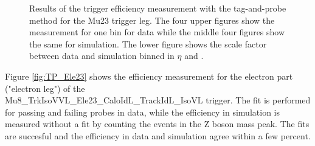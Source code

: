 \begin{figure}[htbp!]
\begin{center}
      \caption{Results of the trigger efficiency measurement with the tag-and-probe method for the Mu23 trigger leg. The four upper figures show the measurement for one bin for data  while the middle four figures show the same for simulation. The lower figure shows 
       the scale factor between data and simulation binned in $\eta$ and \pt. }  
    \label{fig:TP_Mu23}
  \end{center}
\end{figure}


Figure \ref{fig:TP_Ele23} shows the efficiency measurement for the electron part ("electron leg") of the\\ Mu8\_TrkIsoVVL\_Ele23\_CaloIdL\_TrackIdL\_IsoVL trigger.
The fit is performed for passing and failing probes in data, while the efficiency in simulation is measured without a fit by counting the events in the Z boson mass peak.
The fits are succesful and the efficiency in data and simulation agree within a few percent.

